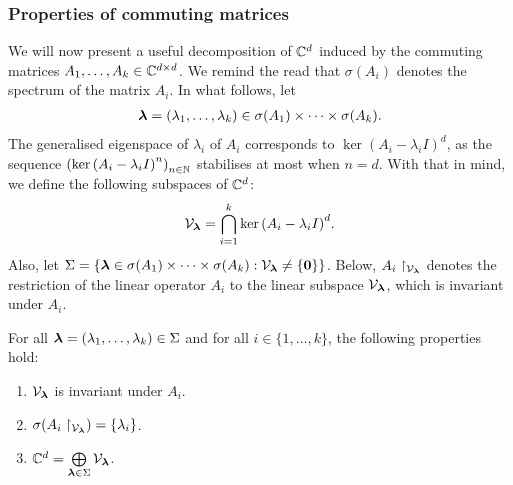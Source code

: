 \subsubsection{Properties of commuting matrices}

We will now present a useful decomposition of $\mathbb{C}^{d}$ induced by the commuting matrices $A_{1}, \ldots, A_{k} \in \mathbb{C}^{d \times d}$. We remind the read that $\sigma(A_{i})$ denotes the spectrum of the matrix $A_{i}$. In what follows, let
\begin{align*}
\boldsymbol{\lambda} = (\lambda_{1}, \ldots, \lambda_{k}) \in \sigma(A_{1}) \times \cdots \times \sigma(A_{k}) .
\end{align*}
The generalised eigenspace of $\lambda_{i}$ of $A_{i}$ corresponds to $\ker{(A_{i} - \lambda_{i} I)}^{d}$, as the sequence ${(\ker{(A_{i} - \lambda_{i} I)}^{n})}_{n \in \mathbb{N}}$ stabilises at most when $n=d$. With that in mind, we define the following subspaces of $\mathbb{C}^{d}$:
\begin{align*}
\mathcal{V}_{\boldsymbol{\lambda}} = \bigcap \limits_{i=1}^{k} \ker{(A_{i} - \lambda_{i} I)}^{d}.
\end{align*}
Also, let $\Sigma = \lbrace \boldsymbol{\lambda} \in \sigma(A_{1}) \times \cdots \times \sigma(A_{k}) : \mathcal{V}_{\boldsymbol{\lambda}} \neq \lbrace \boldsymbol{0} \rbrace \rbrace$.
Below, $A_{i} \restriction_{\mathcal{V}_{\boldsymbol{\lambda}}}$ denotes the restriction of the linear operator $A_{i}$ to the linear subspace $\mathcal{V}_{\boldsymbol{\lambda}}$, which is invariant under $A_{i}$.

\begin{theorem}
\label{subspace_decomposition}
For all $\boldsymbol{\lambda} = (\lambda_{1}, \ldots, \lambda_{k}) \in \Sigma$ and for all $i \in \lbrace 1, \ldots, k \rbrace$, the following properties hold:

\begin{enumerate}

\item $\mathcal{V}_{\boldsymbol{\lambda}}$ is invariant under $A_{i}$.

\item $\sigma(A_{i} \restriction_{\mathcal{V}_{\boldsymbol{\lambda}}}) = \lbrace \lambda_{i} \rbrace$.

\item $\mathbb{C}^{d} = \bigoplus \limits_{\boldsymbol{\lambda} \in \Sigma} \mathcal{V}_{\boldsymbol{\lambda}}$.

\end{enumerate}
\end{theorem}

